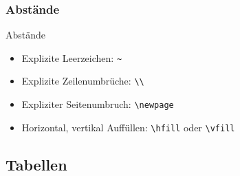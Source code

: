
\begin{frame}[fragile]
	\frametitle{Abstände}

	\begin{block}{Abstände}
    \begin{itemize}[<+->]
      \item Explizite Leerzeichen: \lstinline{~}
      \item Explizite Zeilenumbrüche: \lstinline{\\}
      \item Expliziter Seitenumbruch: \lstinline{\newpage}
      \item Horizontal, vertikal Auffüllen: \lstinline{\hfill} oder \lstinline{\vfill}
    \end{itemize}
	\end{block}
\end{frame}


\subsection{Tabellen}

